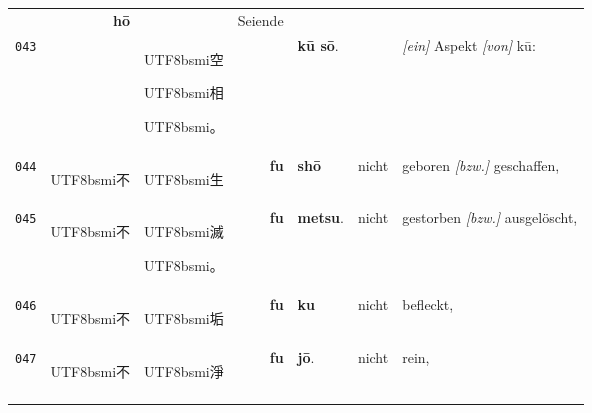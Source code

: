 \documentclass[
DIV=calc,
BCOR=5mm,
11pt,
headings=small,
oneside,
bibtotocnumbered]{scrartcl}
\newcommand{\cnbsmi}[1]{\begin{CJK}{UTF8}{bsmi}#1\end{CJK}}
\begin{document}
\begin{center}
\begin{tabular}{r|rl|rl|rl}
  ~ & \textbf{hō} &
  ~ & \textrm{Seiende} \\
{\tiny\texttt{043}}&
  ~ & \cnbsmi{空} \cnbsmi{相} \cnbsmi{。} &
  ~ & \textbf{kū sō}. &
  ~ & \textrm{\emph{[ein]} Aspekt \emph{[von]} kū}: \\
\hdashline
{\tiny\texttt{044}}&
  \cnbsmi{不} & \cnbsmi{生} &
  \textbf{fu} & \textbf{shō} & 
  \textrm{nicht} & \textrm{geboren \emph{[bzw.]} geschaffen}, \\
{\tiny\texttt{045}}&
  \cnbsmi{不} & \cnbsmi{滅} \cnbsmi{。} &
  \textbf{fu} & \textbf{metsu}. &
  \textrm{nicht} & \textrm{gestorben \emph{[bzw.]} ausgelöscht},\\
\hdashline
{\tiny\texttt{046}}&
  \cnbsmi{不} & \cnbsmi{垢} &
  \textbf{fu} & \textbf{ku} &
  \textrm{nicht} & \textrm{befleckt}, \\
{\tiny\texttt{047}}&
  \cnbsmi{不} & \cnbsmi{淨} &
  \textbf{fu} & \textbf{jō}. &
  \textrm{nicht} & \textrm{rein}, \\
\hdashline
\end{tabular}


\end{center}
\end{document}
